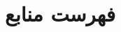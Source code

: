 \makeatletter
\renewenvironment{thebibliography}[1]
     {\list{\@biblabel{\@arabic\c@enumiv}}%
           {\settowidth\labelwidth{\@biblabel{#1}}%
            \leftmargin\labelwidth
            \advance\leftmargin\labelsep
            \@openbib@code
            \usecounter{enumiv}%
            \let\p@enumiv\@empty
            \renewcommand\theenumiv{\@arabic\c@enumiv}}%
      \sloppy
      \clubpenalty4000
      \@clubpenalty \clubpenalty
      \widowpenalty4000%
      \sfcode`\.\@m}
     {\def\@noitemerr
       {\@latex@warning{Empty `thebibliography' environment}}%
      \endlist}
\makeatother

\chapter*{فهرست منابع}
{}

